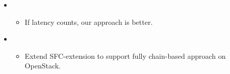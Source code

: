 \begin{itemize}[ $\leftarrow$ we keep the sketch of the storyline currently here only to have a overall view for the draft. This part will be deleted later on]
\item \begin{itemize}[Conclusion]
    \item If latency counts, our approach is better.
\end{itemize}

\item \begin{itemize}[Future Work]
    \item Extend SFC-extension to support fully chain-based approach on OpenStack.
\end{itemize}



    \end{itemize}
